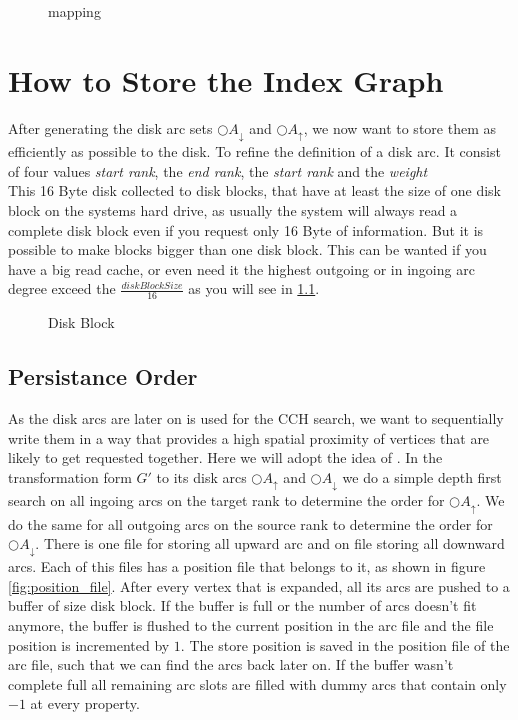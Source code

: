 \begin{figure}
    \centering
    
    \caption{mapping}
    \label{fig:mapping}
\end{figure}

\section{How to Store the Index Graph}\label{sec:how_to_store}

After generating the disk arc sets $\bigcirc A_\downarrow$ and $\bigcirc A_\uparrow$, we now want to store them as efficiently as possible to the disk. To refine the definition of a disk arc. It consist of four values \textit{start rank}, the \textit{end rank}, the \textit{start rank} and the \textit{weight} 
\\
This 16 Byte disk collected to disk blocks, that have at least the size of one disk block on the systems hard drive, as usually the system will always read a complete disk block even if you request only 16 Byte of information. But it is possible to make blocks bigger than one disk block. This can be wanted if you have a big read cache,
or even need it the highest outgoing or in ingoing arc degree exceed the $\frac{diskBlockSize}{16}$ as you will see in \ref{sec:persistanceOrder}.

\begin{figure}
    \centering
    
    \caption{Disk Block}
    \label{fig:disk_block}
\end{figure}

\subsection{Persistance Order}\label{sec:persistanceOrder}

As the disk arcs are later on is used for the CCH search, we want to sequentially write them in a way that provides a high spatial proximity of vertices that are likely to get requested together. Here we will adopt the idea of \cite[Mobile Route Planning]{Sanders}. In the transformation form $G'$ to its disk arcs $\bigcirc A_\uparrow$ 
and $\bigcirc A_\downarrow$ we do a simple depth first search on all ingoing arcs on the target rank to determine the order for $\bigcirc A_\uparrow$. We do the same for all outgoing arcs on the source rank to determine the order for $\bigcirc A_\downarrow$.
There is one file for storing all upward arc and on file storing all downward arcs. Each of this files has a position file that belongs to it, as shown in figure \ref{fig:position_file}. After every vertex that is expanded, all its arcs are pushed to a buffer of size disk block. If the buffer is full or the number of arcs doesn't fit anymore,
the buffer is flushed to the current position in the arc file and the file position is incremented by $1$. The store position is saved in the position file of the arc file, such that we can find the arcs back later on. If the buffer wasn't complete full all remaining arc slots are filled with dummy arcs that contain only $-1$ at every property.


